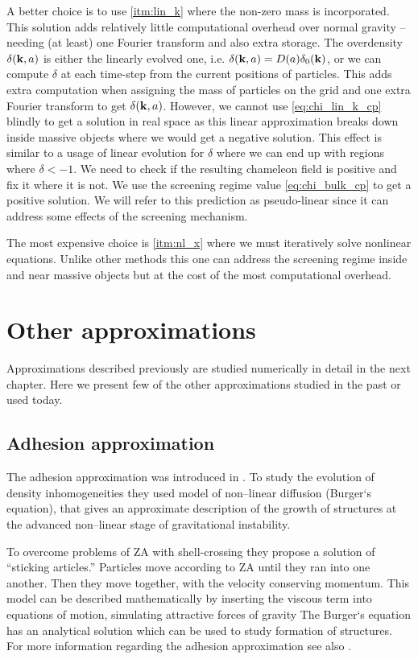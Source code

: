 A better choice is to use \ref{itm:lin_k} where the non-zero mass is incorporated. This solution adds relatively little computational overhead over normal gravity -- needing (at least) one Fourier transform and also extra storage. The overdensity $\delta(\mathbf k, a)$ is either the linearly evolved one, i.e. $\delta(\mathbf k, a) = D(a)\delta_0(\mathbf k)$, or we can compute $\delta$ at each time-step from the current positions of particles. This adds extra computation when assigning the mass of particles on the grid and one extra Fourier transform to get $\delta(\mathbf k, a)$. 
However, we cannot use \eqref{eq:chi_lin_k_cp} blindly to get a solution in real space as this linear approximation breaks down inside massive objects where we would get a negative solution. This effect is similar to a usage of linear evolution for $\delta$ where we can end up with regions where $\delta<-1$. We need to check if the resulting chameleon field is positive and fix it where it is not. We use the screening regime value \eqref{eq:chi_bulk_cp} to get a positive solution. We will refer to this prediction as pseudo-linear since it can address some effects of the screening mechanism.

The most expensive choice is \ref{itm:nl_x} where we must iteratively solve nonlinear equations. Unlike other methods this one can address the screening regime inside and near massive objects but at the cost of the most computational overhead.

\section{Other approximations}
Approximations described previously are studied numerically in detail in the next chapter. Here we present few of the other approximations studied in the past or used today.

\subsection{Adhesion approximation}
The adhesion approximation was introduced in \textcite{1989MNRAS.236..385G}. To study the evolution of density inhomogeneities they used model of non--linear diffusion (Burger`s equation), that gives an approximate description of the growth of structures at the advanced non--linear stage of gravitational instability.

To overcome problems of ZA with shell-crossing they propose a solution of ``sticking articles.'' Particles move according to ZA until they ran into one another. Then they move together, with the velocity conserving momentum. This model can be described mathematically by inserting the viscous term into equations of motion, simulating attractive forces of gravity
The Burger`s equation has an analytical solution which can be used to study formation of structures. For more information regarding the adhesion approximation see  also \textcite{1990MNRAS.247..260W,1994ApJ...428...28M}.


